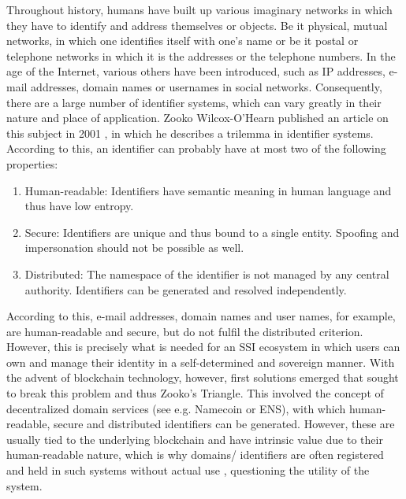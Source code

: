 	    Throughout history, humans have built up various imaginary networks in which they have to identify and address themselves or objects. Be it physical, mutual networks, in which one identifies itself with one's name or be it postal or telephone networks in which it is the addresses or the telephone numbers. In the age of the Internet, various others have been introduced, such as IP addresses, e-mail addresses, domain names or usernames in social networks. Consequently, there are a large number of identifier systems, which can vary greatly in their nature and place of application. Zooko Wilcox-O'Hearn published an article on this subject in 2001 \cite{wilcox-ohearn_names_2001}, in which he describes a trilemma in identifier systems. According to this, an identifier can probably have at most two of the following properties: \cite[pp. 183-186]{preukschat_self-sovereign_2021}
	    
	    \begin{enumerate}
        	\item Human-readable: Identifiers have semantic meaning in human language and thus have low entropy. 
        	\item Secure: Identifiers are unique and thus bound to a single entity. Spoofing and impersonation should not be possible as well.
        	\item Distributed: The namespace of the identifier is not managed by any central authority. Identifiers can be generated and resolved independently.
        \end{enumerate}
        
        According to this, e-mail addresses, domain names and user names, for example, are human-readable and secure, but do not fulfil the distributed criterion. However, this is precisely what is needed for an SSI ecosystem in which users can own and manage their identity in a self-determined and sovereign manner. With the advent of blockchain technology, however, first solutions emerged that sought to break this problem and thus Zooko's Triangle. This involved the concept of decentralized domain services (see e.g. Namecoin or ENS), with which human-readable, secure and distributed identifiers can be generated. However, these are usually tied to the underlying blockchain and have intrinsic value due to their human-readable nature, which is why domains/ identifiers are often registered and held in such systems without actual use \cite{kalodner_empirical_2015}, questioning the utility of the system.
        
